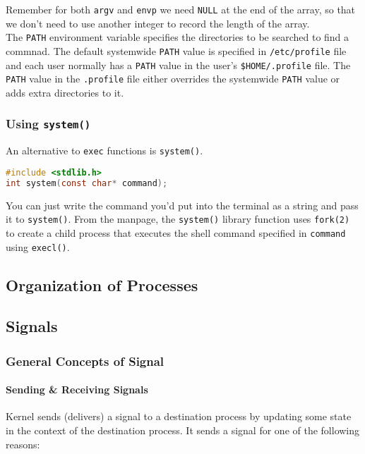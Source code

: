 \documentclass{article}
\newcommand{\code}[1]{\texttt{#1}}
\begin{document}
Remember for both \code{argv} and \code{envp} we need \code{NULL} at the end of the array, so that we don't need to use another integer to record the length of the array. \\ 

The \code{PATH} environment variable specifies the directories to be searched to find a commnad. The default systemwide \code{PATH} value is specified in \code{/etc/profile} file and each user normally has a \code{PATH} value in the user's \code{\$HOME/.profile} file. The \code{PATH} value in the \code{.profile} file either overrides the systemwide \code{PATH} value or adds extra directories to it. 

\subsubsection{Using \code{system()}}

An alternative to \code{exec} functions is \code{system()}.

\begin{lstlisting}[language=C]
#include <stdlib.h>
int system(const char* command);
\end{lstlisting}

You can just write the command you'd put into the terminal as a string and pass it to \code{system()}. From the manpage, the \code{system()} library function uses \code{fork(2)} to create a child process that executes the shell command specified in \code{command} using \code{execl()}. 

\subsection{Organization of Processes}

\subsection{Signals}

\subsubsection{General Concepts of Signal}

\paragraph{Sending \& Receiving Signals}

Kernel sends (delivers) a signal to a destination process by updating some state in the context of the destination process. It sends a signal for one of the following reasons:
\end{document}
